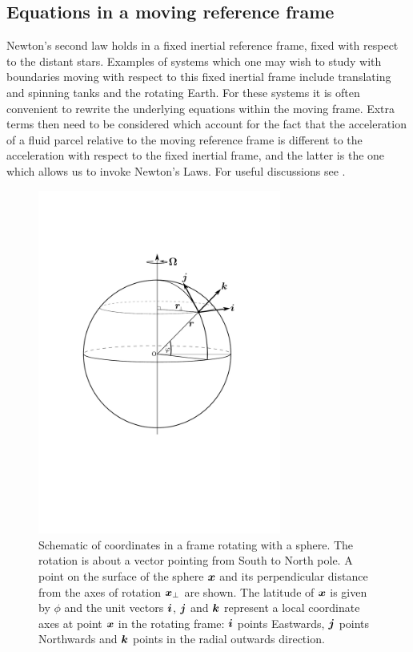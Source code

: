\subsection{Equations in a moving reference frame}\label{sect:coriolis}
Newton's second law holds in a fixed inertial reference frame, \ie
fixed with respect to the distant stars. 
Examples of systems which one may wish to study with boundaries moving
with respect to this fixed inertial frame include translating and spinning tanks
and the rotating Earth. For these systems it is often convenient to rewrite the 
underlying equations within the moving frame. Extra terms then need to be considered 
which account for the fact that the acceleration of a fluid parcel relative to the 
moving reference frame is different to the acceleration with respect to the fixed 
inertial frame, and the latter is the one which allows us to invoke Newton's Laws.
For useful discussions see \citep{batchelor1967,cushman1994,gill1982}.

\begin{figure}\label{fig:rotating_frame}
\centering
\includegraphics[width=8.0cm]{misc_images/coordinates.pdf}
\caption{Schematic of coordinates in a frame rotating with a sphere. The rotation is about a vector
pointing from South to North pole. A point on the surface of the sphere ${\mbox{\boldmath$x$}}$ and its perpendicular
distance from the axes of rotation ${\mbox{\boldmath$x$}}_{\perp}$ are shown. The latitude of ${\mbox{\boldmath$x$}}$ is given by $\phi$ 
and the unit vectors ${\mbox{\boldmath$i$}}$, ${\mbox{\boldmath$j$}}$ and ${\mbox{\boldmath$k$}}$ represent a local coordinate axes at point ${\mbox{\boldmath$x$}}$ in the rotating
frame: ${\mbox{\boldmath$i$}}$ points Eastwards, ${\mbox{\boldmath$j$}}$ points Northwards and ${\mbox{\boldmath$k$}}$ points in the radial outwards direction.}
\end{figure}

